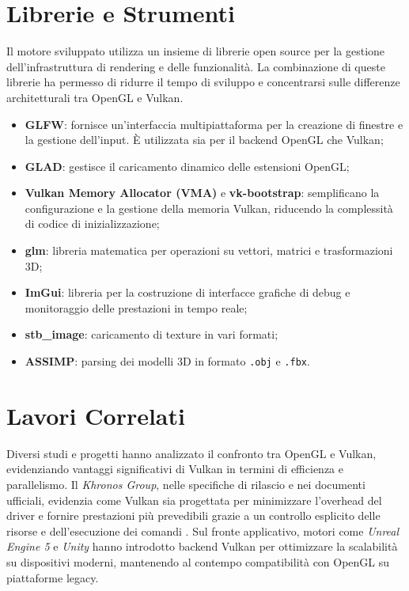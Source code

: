 \documentclass[12pt,a4paper,openright,twoside]{book}
\begin{document}
\section{Librerie e Strumenti}
Il motore sviluppato utilizza un insieme di librerie open source per la gestione dell'infrastruttura di rendering
e delle funzionalità.
La combinazione di queste librerie ha permesso di ridurre il tempo di sviluppo e concentrarsi sulle differenze
architetturali tra OpenGL e Vulkan.
\begin{itemize}
   \item \textbf{GLFW}: fornisce un'interfaccia multipiattaforma per la creazione di finestre e la gestione dell'input.
      È utilizzata sia per il backend OpenGL che Vulkan;
   \item \textbf{GLAD}: gestisce il caricamento dinamico delle estensioni OpenGL;
   \item \textbf{Vulkan Memory Allocator (VMA)} e \textbf{vk-bootstrap}: semplificano la configurazione e la gestione della memoria
      Vulkan, riducendo la complessità di codice di inizializzazione;
   \item \textbf{glm}: libreria matematica per operazioni su vettori, matrici e trasformazioni 3D;
   \item \textbf{ImGui}: libreria per la costruzione di interfacce grafiche di debug e monitoraggio delle prestazioni in tempo reale;
   \item \textbf{stb\_image}: caricamento di texture in vari formati;
   \item \textbf{ASSIMP}: parsing dei modelli 3D in formato \texttt{.obj} e \texttt{.fbx}.
\end{itemize}

\section{Lavori Correlati}
Diversi studi e progetti hanno analizzato il confronto tra OpenGL e Vulkan, evidenziando vantaggi significativi di
Vulkan in termini di efficienza e parallelismo.
Il \emph{Khronos Group}, nelle specifiche di rilascio e nei documenti ufficiali, evidenzia come Vulkan sia progettata per
minimizzare l'overhead del driver e fornire prestazioni più prevedibili grazie a un controllo esplicito delle risorse e
dell'esecuzione dei comandi \cite{khronos_vulkan_spec,vulkan_overview,google_vulkan_lowoverhead}.
Sul fronte applicativo, motori come \emph{Unreal Engine 5} e \emph{Unity} hanno introdotto backend Vulkan per
ottimizzare la scalabilità su dispositivi moderni, mantenendo al contempo compatibilità con OpenGL su piattaforme legacy.
\end{document}
